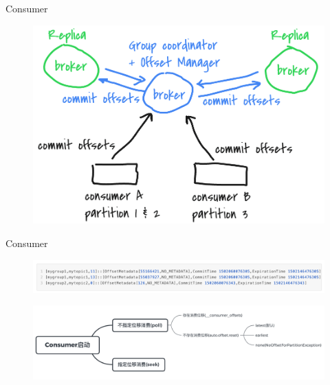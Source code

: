 \begin{frame}[plain,t]{Consumer} %
     \\
    \vspace{2ex}
    
    
    \begin{figure}
        \centering
        \includegraphics[width=0.7\linewidth]{image/0306}
        \label{fig:0306}
    \end{figure}
    
\end{frame}
\begin{frame}[plain,t]{Consumer} %
     \\
    \vspace{2ex}

    \begin{figure}
        \centering
        \includegraphics[width=1\linewidth]{image/0219}
        \label{fig:0219}
    \end{figure}
    \begin{figure}
        \centering
        \includegraphics[width=0.9\linewidth]{image/0217}
        \label{fig:0217}
    \end{figure}
\end{frame}

